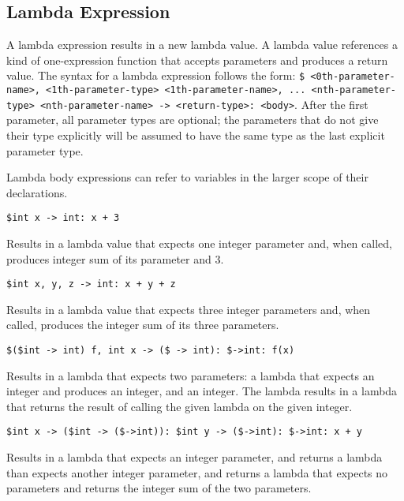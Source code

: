 
\subsection{Lambda Expression}
{
	A lambda expression results in a new lambda value.
	A lambda value references a kind of
	one-expression function that accepts parameters and produces a return value.
	The syntax for a lambda expression follows the
	form: \texttt{\$<0th-parameter-type> <0th-parameter-name>,
	<1th-parameter-type> <1th-parameter-name>, ... <nth-parameter-type>
	<nth-parameter-name> -> <return-type>: <body>}.
	After the first parameter, all parameter types are optional; the
	parameters that do not give their type explicitly will be assumed to
	have the same type as the last explicit parameter type.
	
	Lambda body expressions can refer to variables in the larger scope of their
	declarations.
	
	\begin{itemize}
	{
		\item[] \texttt{\$int x -> int: x + 3}
		
			Results in a lambda value that expects
			one integer parameter and, when called, produces integer sum
			of its parameter and 3.
		
		\item[] \texttt{\$int x, y, z -> int: x + y + z}
		
			Results in a lambda value that expects
			three integer parameters and, when called, produces the integer sum
			of its three parameters.
		
		\item[] \texttt{\$(\$int -> int) f, int x -> (\$ -> int): \$->int: f(x)}
		
			Results in a lambda that expects two parameters:
			a lambda that expects an integer and produces an integer,
			and an integer. The lambda results in a lambda that returns the
			result of calling the given lambda on the given integer.
		
		\item[] \texttt{\$int x -> (\$int -> (\$->int)): \$int y -> (\$->int): \$->int: x + y}
		
			Results in a lambda that expects an integer parameter, and returns
			a lambda than expects another integer parameter, and returns
			a lambda that expects no parameters and returns the integer sum
			of the two parameters.
	}
	\end{itemize}
}














